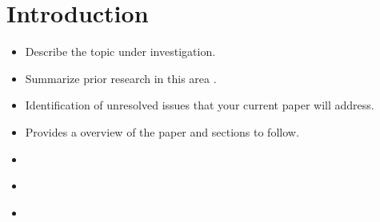 \section{Introduction}

\begin{itemize}
  \item Describe the topic under investigation.
  \item Summarize prior research in this area \citep{vaswani-2017-attention}.
  \item Identification of unresolved issues that your current paper will address.
  \item Provides a overview of the paper and sections to follow.
\end{itemize}


\begin{itemize}
  \item \citep{wiki-2021-melanoma}
  \item \citep{acs-2021-melanoma}
  \item \citep{isic-2018-segmentation}
\end{itemize}